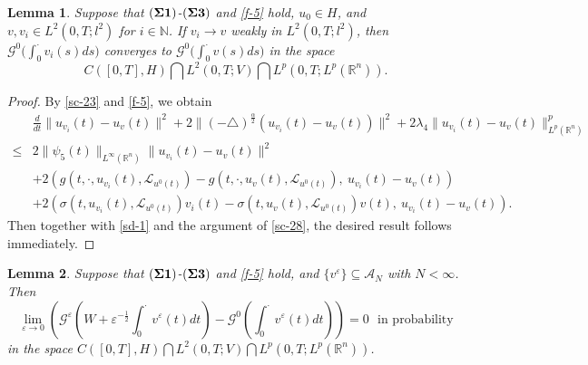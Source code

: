 \documentclass[11pt]{article}
\numberwithin{equation}{section}
\theoremstyle{plain}
\newtheorem{lemma}{Lemma}[section]
\def\leq{\leqslant}
\begin{document}
 \begin{lemma} \label{h1-sd}
    Suppose that $({\bf \Sigma 1})$-$({\bf \Sigma 3})$ and \eqref{f-5} hold,
    $u_0 \in H$, and
    $v, v_i \in L^2(0, T; l^2)$ for $i \in \mathbb{N}$.
    If $v_i \rightarrow v$ weakly in $L^2(0, T; l^2)$,
    then
    $\mathcal{G}^0 \big( \int_0^\cdot v_i(s) ds \big)$
    converges to
    $\mathcal{G}^0 \big( \int_0^\cdot v(s) ds \big)$
    in the space
    $$C([0,T], H)
    \bigcap
    L^2(0,T; V)
    \bigcap
    L^p(0,T; L^p(\mathbb{R}^n ) ).
    $$
 \end{lemma}

 \begin{proof}
    By \eqref{sc-23} and \eqref{f-5}, we obtain
    \begin{align}\label{sd-1}
        & \frac{d}{dt} \| u_{v_i}(t) - u_v(t) \|^2
        + 2 \| (-\triangle)^{\frac{\alpha}{2}} \left( u_{v_i}(t) - u_v(t) \right) \|^2
        + 2 \lambda_4 \| u_{v_i}(t) - u_v(t)\|_{L^p(\mathbb{R}^n)}^p
        \nonumber \\
        \leq & 2 \| \psi_5(t) \|_{L^\infty(\mathbb{R}^n)}
        \| u_{v_i}(t) - u_v(t) \|^2
        \nonumber \\
        & + 2
        \left( g(t, \cdot, u_{v_i}(t), \mathcal{L}_{u^0(t)} )
        - g(t, \cdot, u_v(t), \mathcal{L}_{u^0(t)} ), \
        u_{v_i}(t) - u_v(t)
        \right)  \nonumber \\
        & + 2
        \left(
        \sigma(t, u_{v_i}(t), \mathcal{L}_{u^0(t)} ) v_i(t)
        - \sigma(t, u_v(t), \mathcal{L}_{u^0(t)} ) v(t), \
        u_{v_i}(t) - u_v(t)
        \right).
    \end{align}
    Then together with \eqref{sd-1} and the argument of \eqref{sc-28},
    the desired result follows immediately.
 \end{proof}



 \begin{lemma}\label{h2-sd}
    Suppose that $({\bf \Sigma 1})$-$({\bf \Sigma 3})$ and \eqref{f-5} hold,
    and $\{ v^\varepsilon \} \subseteq \mathcal{A}_N$ with $ N < \infty$.
    Then
    $$
    \lim_{\varepsilon \to 0}
    \left ( \mathcal{G}^\varepsilon
    \left( W + \varepsilon^{-\frac{1}{2}}
    \int_{0}^{\cdot} v^\varepsilon(t) dt
    \right)
    - \mathcal{G}^0
    \left( \int_{0}^{\cdot} v^\varepsilon(t) dt
    \right)
    \right ) = 0
    \ \ \  \text{in probability}
    $$
    in the space
    $C([0,T], H) \bigcap L^2(0,T; V) \bigcap L^p(0,T; L^p(\mathbb{R}^n ) )$.
 \end{lemma}
\end{document}
